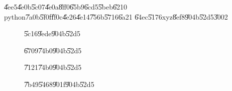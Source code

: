 \documentclass[12pt]{article}
\begin{document}
\U{4ee5}\U{4e0b}\U{5c07}\U{4e0a}\U{8ff0}\U{65b9}\U{6cd5}\U{5beb}\U{6210}%
python\U{7a0b}\U{5f0f}\U{ff0c}\U{4e26}\U{4e14}\U{756b}\U{5716}\U{6a21}%
\U{64ec}\U{5176}xyz\U{8ef8}\U{904b}\U{52d5}\U{3002}

\begin{figure}[th]
\caption{\U{5c16}\U{9ede}\U{904b}\U{52d5}}
\begin{center}
\end{center}
\end{figure}
\bigskip

\begin{figure}[th]
\caption{\U{6709}\U{74b0}\U{904b}\U{52d5}}
\begin{center}
\end{center}
\end{figure}

\begin{figure}[th]
\caption{\U{7121}\U{74b0}\U{904b}\U{52d5}}
\begin{center}
\end{center}
\end{figure}

\begin{figure}[th]
\caption{\U{7b49}\U{5468}\U{901f}\U{904b}\U{52d5}}
\label{figure_uniform}
\begin{center}
\end{center}
\end{figure}
\end{document}
